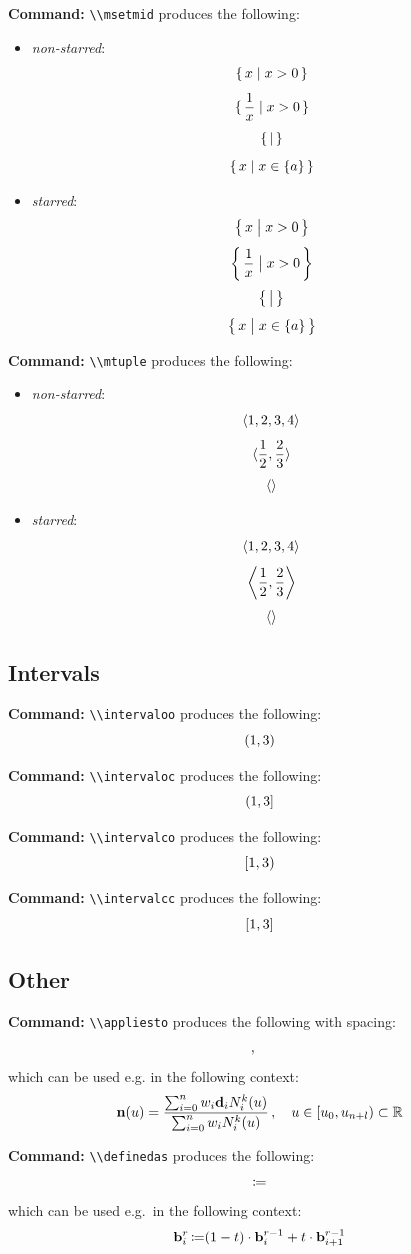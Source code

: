 \documentclass[a4paper,10pt,oneside]{scrartcl}
\newcommand{\commandcmd}[1]{\par\noindent\textbf{Command:} \lstinline^\\#1^}
\begin{document}
\commandcmd{msetmid} produces the following:
\begin{itemize}
  \item \emph{non-starred}:
        \[\msetmid{x}{x > 0}\]
        \[\msetmid{\frac{1}{x}}{x > 0}\]
        \[\msetmid{}{}\]
        \[\msetmid{x}{x \in \mset{a}}\]
  \item \emph{starred}:
        \[\msetmid*{x}{x > 0}\]
        \[\msetmid*{\frac{1}{x}}{x > 0}\]
        \[\msetmid*{}{}\]
        \[\msetmid*{x}{x \in \mset{a}}\]
\end{itemize}

\commandcmd{mtuple} produces the following:
\begin{itemize}
  \item \emph{non-starred}:
        \[\mtuple{1, 2, 3, 4}\]
        \[\mtuple{\frac{1}{2}, \frac{2}{3}}\]
        \[\mtuple{}\]
  \item \emph{starred}:
        \[\mtuple*{1, 2, 3, 4}\]
        \[\mtuple*{\frac{1}{2}, \frac{2}{3}}\]
        \[\mtuple*{}\]
\end{itemize}

\subsection{Intervals}

\commandcmd{intervaloo} produces the following:
\[\intervaloo{1,3}\]

\commandcmd{intervaloc} produces the following:
\[\intervaloc{1,3}\]

\commandcmd{intervalco} produces the following:
\[\intervalco{1,3}\]

\commandcmd{intervalcc} produces the following:
\[\intervalcc{1,3}\]

\subsection{Other}

\commandcmd{appliesto} produces the following with spacing:
\[\appliesto\]
which can be used e.g. in the following context:
\[\mathbf{n}(u) = \frac{\sum_{i = 0}^n w_i \mathbf{d}_i N_i^k(u)}{\sum_{i = 0}^n w_i N_i^k(u)} \appliesto u \in \left[u_0, u_{n + l}\right) \subset \mathbb{R}\]

\commandcmd{definedas} produces the following:
\[\definedas\]
which can be used e.g.\ in the following context:
\[\mathbf{b}_i^r \definedas (1 - t) \cdot \mathbf{b}_i^{r - 1} + t \cdot \mathbf{b}_{i + 1}^{r - 1}\]
\end{document}
